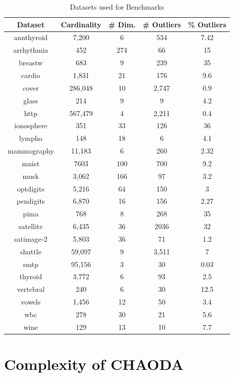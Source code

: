 \documentclass{article}
\begin{document}
\begin{table}[!t]
\renewcommand{\arraystretch}{1.25}
\caption{Datasets used for Benchmarks}
\label{supplement:table:datasets}
\centering
\begin{tabular}{|c|c|c|c|c|}
\hline
\textbf{Dataset} & \textbf{Cardinality} & \textbf{\# Dim.} & \textbf{\# Outliers} & \textbf{\% Outliers} \\
\hline
annthyroid & 7,200 & 6 & 534 & 7.42 \\
\hline
arrhythmia & 452 & 274 & 66 & 15 \\
\hline
breastw & 683 & 9 & 239 & 35 \\
\hline
cardio & 1,831 & 21 & 176 & 9.6 \\
\hline
cover & 286,048 & 10 & 2,747 & 0.9 \\
\hline
glass & 214 & 9 & 9 & 4.2 \\
\hline
http & 567,479 & 4 & 2,211 & 0.4 \\
\hline
ionosphere & 351 & 33 & 126 & 36 \\
\hline
lympho & 148 & 18 & 6 & 4.1 \\
\hline
mammography & 11,183 & 6 & 260 & 2.32 \\
\hline
mnist & 7603 & 100 & 700 & 9.2 \\
\hline
musk & 3,062 & 166 & 97 & 3.2 \\
\hline
optdigits & 5,216 & 64 & 150 & 3 \\
\hline
pendigits & 6,870 & 16 & 156 & 2.27 \\
\hline
pima & 768 & 8 & 268 & 35 \\
\hline
satellite & 6,435 & 36 & 2036 & 32 \\
\hline
satimage-2 & 5,803 & 36 & 71 & 1.2 \\
\hline
shuttle & 59,097 & 9 & 3,511 & 7 \\
\hline
smtp & 95,156 & 3 & 30 & 0.03 \\
\hline
thyroid & 3,772 & 6 & 93 & 2.5 \\
\hline
vertebral & 240 & 6 & 30 & 12.5 \\
\hline
vowels & 1,456 & 12 & 50 & 3.4 \\
\hline
wbc & 278 & 30 & 21 & 5.6 \\
\hline
wine & 129 & 13 & 10 & 7.7 \\
\hline
\end{tabular}
\end{table}


\section{Complexity of CHAODA}
\label{supplement:sec:complexity-chaoda}
\end{document}
